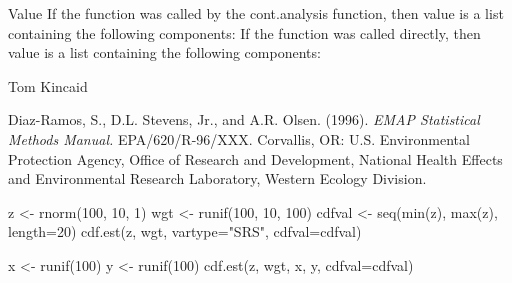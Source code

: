 \begin{Section}{Value}
If the function was called by the cont.analysis function, then value is a list
containing the following components:
If the function was called directly, then value is a list containing the
following components:
\end{Section}
\begin{Author}\relax
Tom Kincaid 
\end{Author}
\begin{References}\relax
Diaz-Ramos, S., D.L. Stevens, Jr., and A.R. Olsen. (1996).  \emph{EMAP
Statistical Methods Manual.} EPA/620/R-96/XXX.  Corvallis, OR: U.S.
Environmental Protection Agency, Office of Research and Development, National
Health Effects and Environmental Research Laboratory, Western Ecology
Division.
\end{References}
\begin{Examples}
\begin{ExampleCode}
z <- rnorm(100, 10, 1)
wgt <- runif(100, 10, 100)
cdfval <- seq(min(z), max(z), length=20)
cdf.est(z, wgt, vartype="SRS", cdfval=cdfval)

x <- runif(100)
y <- runif(100)
cdf.est(z, wgt, x, y, cdfval=cdfval)
\end{ExampleCode}
\end{Examples}

